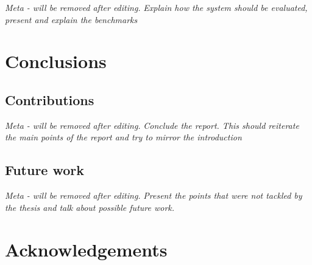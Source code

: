\documentclass[11pt,a4paper]{globis-book}
\begin{document}
\textit{Meta - will be removed after editing.}
\textit{Explain how the system should be evaluated, present and explain the benchmarks}

\chapter{Conclusions}
\label{ch:conclusions}

\section{Contributions}
\label{sec:conclusions-contribution}
\textit{Meta - will be removed after editing.}
\textit{Conclude the report. This should reiterate the main points of the report and try to mirror the introduction}

\section{Future work}
\label{sec:conclusions-future-work}
\textit{Meta - will be removed after editing.}
\textit{Present the points that were not tackled by the thesis and talk about possible future work.}

\appendix

\listoffigures
\listoftables

\chapter*{Acknowledgements}

\newpage
\thispagestyle{empty}



\end{document}
